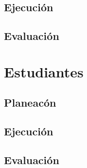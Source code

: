 \documentclass{beamer}
\begin{document}
\subsection{Ejecuci\'on}
\subsection{Evaluaci\'on}
\section{Estudiantes}
\subsection{Planeac\'on}
\subsection{Ejecuci\'on}
\subsection{Evaluaci\'on}
\end{document}
